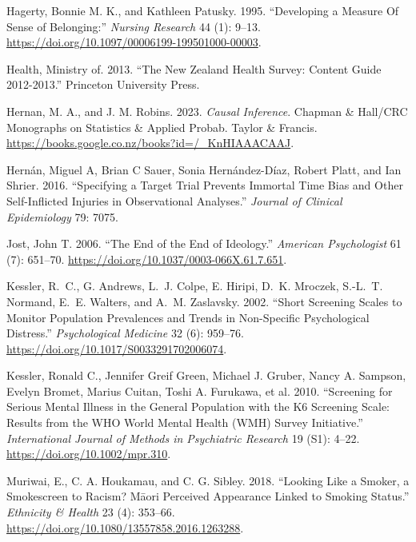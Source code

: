 \documentclass[
  singlecolumn]{report}
\newlength{\cslhangindent}
\newlength{\cslentryspacingunit} %
\newenvironment{CSLReferences}[2] %
 {%
  \setlength{\parindent}{0pt}
  \ifodd #1
  \let\oldpar\par
  \def\par{\hangindent=\cslhangindent\oldpar}
  \fi
  \setlength{\parskip}{#2\cslentryspacingunit}
 }%
 {}
\begin{document}
\begin{CSLReferences}{1}{0}
\leavevmode{}%
Hagerty, Bonnie M. K., and Kathleen Patusky. 1995. {``Developing a
Measure Of Sense of Belonging:''} \emph{Nursing Research} 44 (1): 9--13.
\url{https://doi.org/10.1097/00006199-199501000-00003}.

\leavevmode{}%
Health, Ministry of. 2013. {``The New Zealand Health Survey: Content
Guide 2012-2013.''} Princeton University Press.

\leavevmode{}%
Hernan, M. A., and J. M. Robins. 2023. \emph{Causal Inference}. Chapman
\& Hall/CRC Monographs on Statistics \& Applied Probab. Taylor \&
Francis. \url{https://books.google.co.nz/books?id=/_KnHIAAACAAJ}.

\leavevmode{}%
Hernán, Miguel A, Brian C Sauer, Sonia Hernández-Díaz, Robert Platt, and
Ian Shrier. 2016. {``Specifying a Target Trial Prevents Immortal Time
Bias and Other Self-Inflicted Injuries in Observational Analyses.''}
\emph{Journal of Clinical Epidemiology} 79: 7075.

\leavevmode{}%
Jost, John T. 2006. {``The End of the End of Ideology.''} \emph{American
Psychologist} 61 (7): 651--70.
\url{https://doi.org/10.1037/0003-066X.61.7.651}.

\leavevmode{}%
Kessler, R.~C., G. Andrews, L.~J. Colpe, E. Hiripi, D.~K. Mroczek,
S.-L.~T. Normand, E.~E. Walters, and A.~M. Zaslavsky. 2002. {``Short
Screening Scales to Monitor Population Prevalences and Trends in
Non-Specific Psychological Distress.''} \emph{Psychological Medicine} 32
(6): 959--76. \url{https://doi.org/10.1017/S0033291702006074}.

\leavevmode{}%
Kessler, Ronald C., Jennifer Greif Green, Michael J. Gruber, Nancy A.
Sampson, Evelyn Bromet, Marius Cuitan, Toshi A. Furukawa, et al. 2010.
{``Screening for Serious Mental Illness in the General Population with
the K6 Screening Scale: Results from the WHO World Mental Health (WMH)
Survey Initiative.''} \emph{International Journal of Methods in
Psychiatric Research} 19 (S1): 4--22.
\url{https://doi.org/10.1002/mpr.310}.

\leavevmode{}%
Muriwai, E., C. A. Houkamau, and C. G. Sibley. 2018. {``Looking Like a
Smoker, a Smokescreen to Racism? Māori Perceived Appearance Linked to
Smoking Status.''} \emph{Ethnicity \& Health} 23 (4): 353--66.
\url{https://doi.org/10.1080/13557858.2016.1263288}.


\end{CSLReferences}
\end{document}
